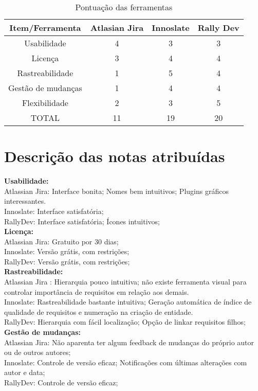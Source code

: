 \begin{table}[h]
\centering
\caption{Pontuação das ferramentas}
\vspace{0.5cm}
\begin{tabular}{| c | c | c | c |} \hline
Item/Ferramenta & Atlasian Jira  & Innoslate & Rally Dev \\ \hline
Usabilidade & 4 & 3 & 3 \\
Licença & 3 & 4 & 4 \\
Rastreabilidade & 1 & 5 & 4 \\
Gestão de mudanças & 1 & 4 & 4 \\
Flexibilidade & 2 & 3 & 5  \\ \hline
TOTAL & 11 & 19 & 20 \\ \hline
\end{tabular}
\end{table}

\section {\large{Descrição das notas atribuídas}}

\textbf{Usabilidade:}\\
\tab Atlassian Jira: Interface bonita; Nomes bem intuitivos; Plugins gráficos interessantes.\\
\tab Innoslate: Interface satisfatória; \\
\tab RallyDev: Interface satisfatória; Ícones intuitivos;\\

\textbf{Licença:}\\
\tab Atlassian Jira: Gratuito por 30 dias;\\
\tab Innoslate: Versão grátis, com restrições;\\
\tab RallyDev: Versão grátis, com restrições;\\

\textbf{Rastreabilidade:}\\
\tab Atlassian Jira : Hierarquia pouco intuitiva; não existe ferramenta visual para controlar importância de requisitos em relação aos demais.\\
\tab Innoslate: Rastreabilidade bastante intuitiva; Geração automática de índice de qualidade de requisitos e numeração na criação de entidade.\\
\tab RallyDev: Hierarquia com fácil localização; Opção de linkar requisitos filhos;\\

\textbf{Gestão de mudanças:}\\
\tab Atlassian Jira: Não aparenta ter algum feedback de mudanças do próprio autor ou de outros autores;\\
\tab Innoslate: Controle de versão eficaz; Notificações com últimas alterações com autor e data;\\
\tab RallyDev: Controle de versão eficaz;\\

